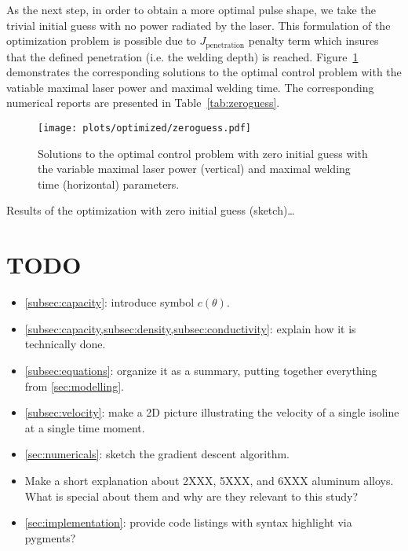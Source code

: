 As the next step, in order to obtain a more optimal pulse shape, we take the trivial initial guess with no power radiated by the laser. This formulation of the optimization problem is possible due to $J_\text{penetration}$ penalty term which insures that the defined penetration (i.e. the welding depth) is reached. Figure~\ref{fig:zeroguess} demonstrates the corresponding solutions to the optimal control problem with the vatiable maximal laser power and maximal welding time. The corresponding numerical reports are presented in Table~\ref{tab:zeroguess}.

\begin{figure} \label{fig:zeroguess}
	\centering
	\texttt{[image: plots/optimized/zeroguess.pdf]}
	\caption{Solutions to the optimal control problem with zero initial guess with the variable maximal laser power (vertical) and maximal welding time (horizontal) parameters.}
\end{figure}

\begin{table} \label{tab:zeroguess}
	\centering
	
	\caption{Results of the optimization with zero initial guess (sketch)\ldots}
\end{table}

\appendix


\section{TODO}
\begin{itemize}
	\item \cref{subsec:capacity}: introduce symbol $c(\theta)$.
	\item \cref{subsec:capacity,subsec:density,subsec:conductivity}: explain how it is technically done.
	\item \cref{subsec:equations}: organize it as a summary, putting together everything from \cref{sec:modelling}.
	\item \cref{subsec:velocity}: make a 2D picture illustrating the velocity of a single isoline at a single time moment.
	\item \cref{sec:numericals}: sketch the gradient descent algorithm.
	\item Make a short explanation about 2XXX, 5XXX, and 6XXX aluminum alloys. What is special about them and why are they relevant to this study?
	\item \cref{sec:implementation}: provide code listings with syntax highlight via pygments?
\end{itemize}
